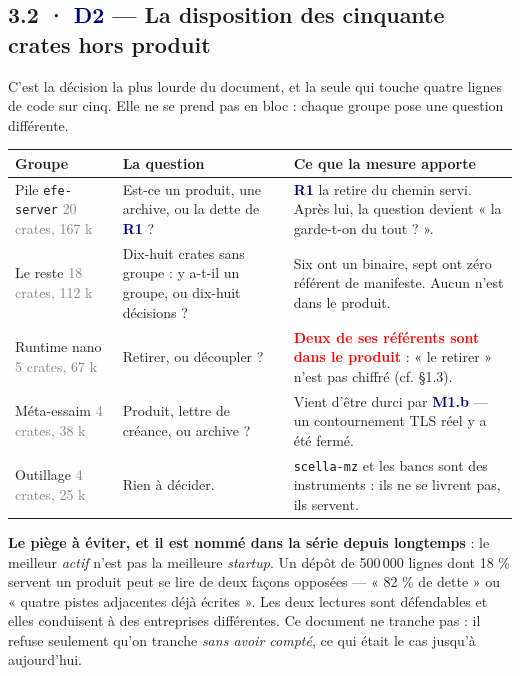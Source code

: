 \documentclass[10pt]{article}
\newcommand{\pire}[1]{\textcolor{red}{\textbf{#1}}}
\newcommand{\sz}[1]{\textcolor{grey}{\small\textsf{#1}}}
\newcommand{\code}[1]{\texttt{\small #1}}
\newcommand{\mm}[1]{\textbf{\textcolor{navy}{#1}}}
\begin{document}
\subsection{3.2 · \mm{D2} --- La disposition des cinquante crates hors produit}

C'est la décision la plus lourde du document, et la seule qui touche quatre lignes de code sur
cinq. Elle ne se prend pas en bloc : chaque groupe pose une question différente.

\begin{center}\small
\renewcommand{\arraystretch}{1.3}
\begin{tabular}{@{}>{\raggedright\arraybackslash}p{3.5cm} >{\raggedright\arraybackslash}p{5.4cm} >{\raggedright\arraybackslash}p{6.0cm}@{}}
\toprule
\textbf{Groupe} & \textbf{La question} & \textbf{Ce que la mesure apporte} \\
\midrule
Pile \code{efe-server} \sz{20 crates, 167 k} &
Est-ce un produit, une archive, ou la dette de \mm{R1} ? &
\mm{R1} la retire du chemin servi. Après lui, la question devient « la garde-t-on du tout ? ». \\
Le reste \sz{18 crates, 112 k} &
Dix-huit crates sans groupe : y a-t-il un groupe, ou dix-huit décisions ? &
Six ont un binaire, sept ont zéro référent de manifeste. Aucun n'est dans le produit. \\
Runtime nano \sz{5 crates, 67 k} &
Retirer, ou découpler ? &
\pire{Deux de ses référents sont dans le produit} : « le retirer » n'est pas chiffré (cf. §1.3). \\
Méta-essaim \sz{4 crates, 38 k} &
Produit, lettre de créance, ou archive ? &
Vient d'être durci par \mm{M1.b} --- un contournement TLS réel y a été fermé. \\
Outillage \sz{4 crates, 25 k} &
Rien à décider. &
\code{scella-mz} et les bancs sont des instruments : ils ne se livrent pas, ils servent. \\
\bottomrule
\end{tabular}
\end{center}

\begin{these}
\textbf{Le piège à éviter, et il est nommé dans la série depuis longtemps} : le meilleur
\emph{actif} n'est pas la meilleure \emph{startup}. Un dépôt de 500\,000 lignes dont 18 \% servent
un produit peut se lire de deux façons opposées --- « 82 \% de dette » ou « quatre pistes
adjacentes déjà écrites ». Les deux lectures sont défendables et elles conduisent à des entreprises
différentes. Ce document ne tranche pas : il refuse seulement qu'on tranche \emph{sans avoir
compté}, ce qui était le cas jusqu'à aujourd'hui.
\end{these}
\end{document}

